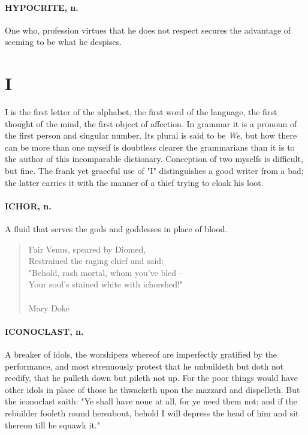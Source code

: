 \documentclass[11pt]{article}
\begin{document}
\paragraph{HYPOCRITE, n.}  One who, profession virtues that he does not respect
secures the advantage of seeming to be what he despises.



\section*{I}



I is the first letter of the alphabet, the first word of the language,
the first thought of the mind, the first object of affection.  In
grammar it is a pronoun of the first person and singular number.  Its
plural is said to be {\em We}, but how there can be more than one myself
is doubtless clearer the grammarians than it is to the author of this
incomparable dictionary.  Conception of two myselfs is difficult, but
fine.  The frank yet graceful use of "I" distinguishes a good writer
from a bad; the latter carries it with the manner of a thief trying to
cloak his loot.

\paragraph{ICHOR, n.}  A fluid that serves the gods and goddesses in place of
blood.

\begin{quote}   Fair Venus, speared by Diomed, \\
  Restrained the raging chief and said: \\
  "Behold, rash mortal, whom you've bled -- \\
  Your soul's stained white with ichorshed!" \\
 \\
Mary Doke \end{quote}


\paragraph{ICONOCLAST, n.}  A breaker of idols, the worshipers whereof are
imperfectly gratified by the performance, and most strenuously protest
that he unbuildeth but doth not reedify, that he pulleth down but
pileth not up.  For the poor things would have other idols in place of
those he thwacketh upon the mazzard and dispelleth.  But the
iconoclast saith:  "Ye shall have none at all, for ye need them not;
and if the rebuilder fooleth round hereabout, behold I will depress
the head of him and sit thereon till he squawk it."
\end{document}
